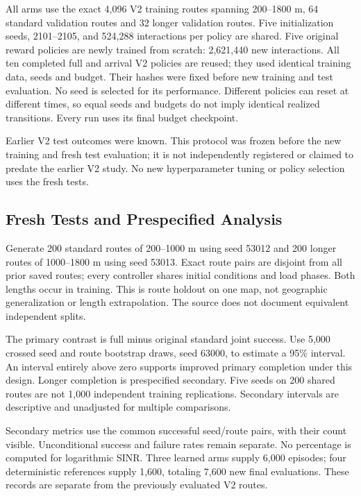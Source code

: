 All arms use the exact 4,096 V2 training routes spanning 200--1800 m, 64 standard
validation routes and 32 longer validation routes. Five initialization seeds,
2101--2105, and 524,288 interactions per policy are shared. Five original reward
policies are newly trained from scratch: 2,621,440 new interactions. All ten
completed full and arrival V2 policies are reused; they used identical training
data, seeds and budget. Their hashes were fixed before new training and test
evaluation. No seed is selected for its performance. Different policies can
reset at different times, so equal seeds and budgets do not imply identical
realized transitions. Every run uses its final budget checkpoint.

Earlier V2 test outcomes were known. This protocol was frozen before the new
training and fresh test evaluation; it is not independently registered or
claimed to predate the earlier V2 study. No new hyperparameter tuning or policy
selection uses the fresh tests.

\subsection{Fresh Tests and Prespecified Analysis}
Generate 200 standard routes of 200--1000 m using seed 53012 and 200 longer
routes of 1000--1800 m using seed 53013. Exact route pairs are disjoint from
all prior saved routes; every controller shares initial conditions and load
phases. Both lengths occur in training. This is route holdout on one map,
not geographic generalization or length extrapolation. The source does not
document equivalent independent splits\cite[pp.~15--16, Secs.~6.2--6.3]{thesis}.

The primary contrast is full minus original standard joint success. Use 5,000
crossed seed and route bootstrap draws, seed 63000, to estimate a 95\% interval.
An interval entirely above zero supports improved primary completion under
this design. Longer completion is prespecified secondary. Five seeds on 200
shared routes are not 1,000 independent training replications. Secondary
intervals are descriptive and unadjusted for multiple comparisons.

Secondary metrics use the common successful seed/route pairs, with their count
visible. Unconditional success and failure rates remain separate. No percentage
is computed for logarithmic SINR. Three learned arms supply 6,000 episodes;
four deterministic references supply 1,600, totaling 7,600 new final evaluations.
These records are separate from the previously evaluated V2 routes.

